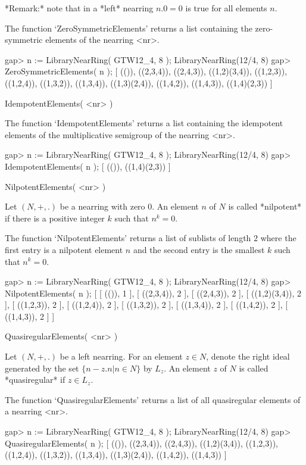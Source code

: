 *Remark:* note that in a *left* nearring $n.0 = 0$ is true for all elements
$n$.

The function `ZeroSymmetricElements' returns a list containing the 
zero-symmetric elements of the nearring <nr>. 

\beginexample
    gap> n := LibraryNearRing( GTW12_4, 8 );            
    LibraryNearRing(12/4, 8)
    gap> ZeroSymmetricElements( n );
    [ (()), ((2,3,4)), ((2,4,3)), ((1,2)(3,4)), ((1,2,3)), ((1,2,4)), 
      ((1,3,2)), ((1,3,4)), ((1,3)(2,4)), ((1,4,2)), ((1,4,3)), 
      ((1,4)(2,3)) ]
\endexample

\>IdempotentElements( <nr> )

The function `IdempotentElements' returns a list containing the 
idempotent elements of the multiplicative semigroup of the nearring <nr>. 

\beginexample
    gap> n := LibraryNearRing( GTW12_4, 8 );            
    LibraryNearRing(12/4, 8)
    gap> IdempotentElements( n );
    [ (()), ((1,4)(2,3)) ]
\endexample

\>NilpotentElements( <nr> )

Let $(N,+,.)$ be a nearring with zero $0$. An element $n$ of $N$ is 
called *nilpotent* if there is a positive integer $k$ such that
$n^k = 0$.

The function `NilpotentElements' returns a list of sublists of length 
$2$ where the first entry is a nilpotent element $n$ and the second
entry is the smallest $k$ such that $n^k = 0$.

\beginexample
    gap> n := LibraryNearRing( GTW12_4, 8 );            
    LibraryNearRing(12/4, 8)
    gap> NilpotentElements( n );
    [ [ (()), 1 ], [ ((2,3,4)), 2 ], [ ((2,4,3)), 2 ], 
      [ ((1,2)(3,4)), 2 ], [ ((1,2,3)), 2 ], [ ((1,2,4)), 2 ], 
      [ ((1,3,2)), 2 ], [ ((1,3,4)), 2 ], [ ((1,4,2)), 2 ], 
      [ ((1,4,3)), 2 ] ]
\endexample

\>QuasiregularElements( <nr> )

Let $(N,+,.)$ be a left nearring. For an element $z \in N$, 
denote the right ideal generated by the set $\{n - z.n | n \in N\}$
by $L_z$.
An element $z$ of $N$ is called *quasiregular* if $z \in L_z$.

The function `QuasiregularElements' returns a list of all 
quasiregular elements of a nearring <nr>.

\beginexample
    gap> n := LibraryNearRing( GTW12_4, 8 );            
    LibraryNearRing(12/4, 8)
    gap> QuasiregularElements( n );
    [ (()), ((2,3,4)), ((2,4,3)), ((1,2)(3,4)), ((1,2,3)), ((1,2,4)), 
      ((1,3,2)), ((1,3,4)), ((1,3)(2,4)), ((1,4,2)), ((1,4,3)) ]
\endexample

